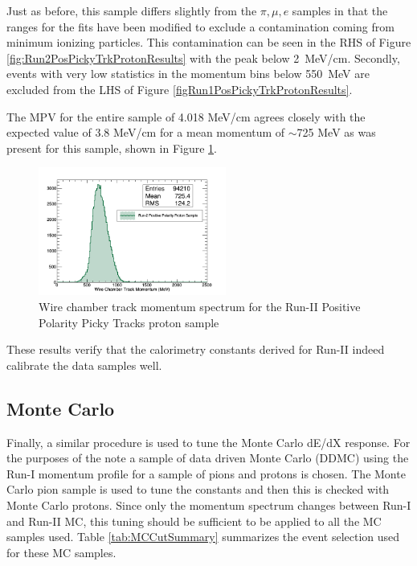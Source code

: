 Just as before, this sample differs slightly from the $\pi, \mu, e$ samples in that the ranges for the fits have been modified to exclude a contamination coming from minimum ionizing particles. This contamination can be seen in the RHS of Figure \ref{fig:Run2PosPickyTrkProtonResults} with the peak below 2~MeV/cm. Secondly, events with very low statistics in the momentum bins below 550~MeV are excluded from the LHS of Figure \ref{figRun1PosPickyTrkProtonResults}.

The MPV for the entire sample of 4.018 MeV/cm agrees closely with the expected value of 3.8 MeV/cm for a mean momentum of $\sim$725  MeV as was present for this sample, shown in Figure \ref{fig:Run1PosPickyTrkProtonMomentumSpec}.

\begin{figure}[htb]
\centering
\includegraphics[width=0.55\textwidth]{images/WCTrkMomentumRun2PosProton.png}
\caption{Wire chamber track momentum spectrum for the Run-II Positive Polarity Picky Tracks proton sample  }
\label{fig:Run1PosPickyTrkProtonMomentumSpec}
\end{figure}

These results verify that the calorimetry constants derived for Run-II indeed calibrate the data samples well.


\subsection{Monte Carlo}\label{sec:MCResults}

Finally, a similar procedure is used to tune the Monte Carlo dE/dX response. For the purposes of the note a sample of data driven Monte Carlo (DDMC) using the Run-I momentum profile  for a sample of pions and protons is chosen. The Monte Carlo pion sample is used to tune the constants and then this is checked with Monte Carlo protons. Since only the momentum spectrum changes between Run-I and Run-II MC, this tuning should be sufficient to be applied to all the MC samples used. Table \ref{tab:MCCutSummary} summarizes the event selection used for these MC samples.

